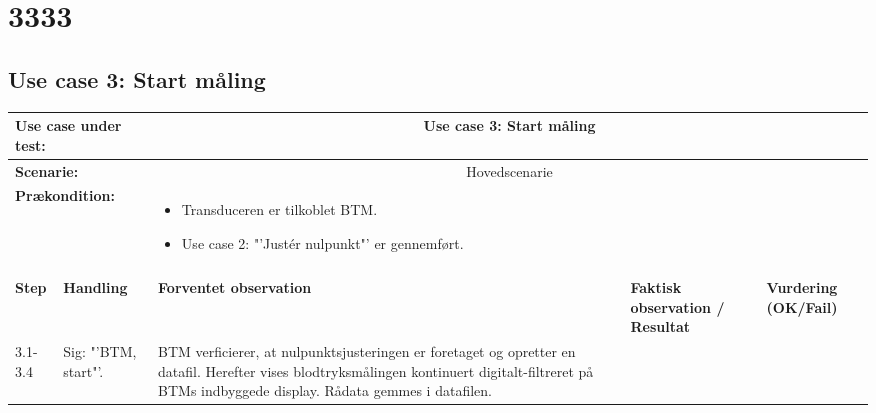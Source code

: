 \chapter{3333}
\section{Use case 3: Start måling}
\begin{tabular}{|p{1cm}|p{3cm}|p{4cm}|p{4cm}|p{2cm}|}
\hline
\multicolumn{2}{|p{3cm}|}{\textbf{Use case under test:}} & \multicolumn{3}{c|}{Use case 3: Start måling} \\\hline

\multicolumn{2}{|p{3cm}|}{\textbf{Scenarie:}} & \multicolumn{3}{c|}{Hovedscenarie} \\\hline

\multicolumn{2}{|p{3cm}|}{\textbf{Prækondition:}}  & \multicolumn{3}{l|}{\parbox{0.6\textwidth}{
\begin{itemize}[label=$\circ$]
\item Transduceren er tilkoblet BTM.
\item Use case 2: "'Justér nulpunkt"' er gennemført.  
\end{itemize} }}\\\hline

\multicolumn{5}{|c|}{} \\\hline

\textbf{Step} & \textbf{Handling} & \textbf{Forventet observation} & \textbf{Faktisk observation / Resultat} & \textbf{Vurdering (OK/Fail)}\\\hline

3.1-3.4 & Sig: "'BTM, start"'. & BTM verficierer, at nulpunktsjusteringen er foretaget og opretter en datafil. Herefter vises blodtryksmålingen kontinuert digitalt-filtreret på BTMs indbyggede display. Rådata gemmes i datafilen. &  & \\\hline
\end{tabular}



